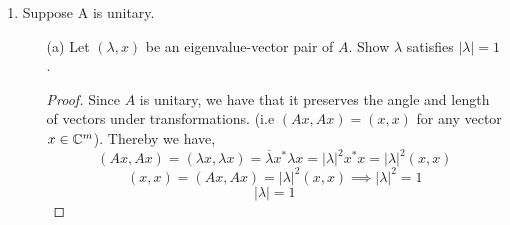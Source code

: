 \documentclass{article}
\begin{document}
\begin{enumerate}
\begin{proof}

By the property of $A$ being hermitian, that we can write any vector, $x \in \C_m, x \neq \vec{0}$ as the linear combination of the orthonormal eigenvectors of $A$, $u_i$. 
\[
    x = \alpha_1u_1 + \cdots + \alpha_mu_m
\]
We then look the inner product, $(Ax, x)$. 
\[
    Ax = A(\alpha_1u_1 + \cdots + \alpha_mu_m) = \lambda_1\alpha_1u_1 + \cdots + \lambda_m\alpha_mu_m
\]
\[
    (Ax)^* = \overline{\lambda_1\alpha_1} u_1^* + \cdots + \overline{\lambda_m\alpha_m}u_m^*
\]
\[
    (Ax, x) = (\overline{\lambda_1\alpha_1} u_1^* + \cdots + \overline{\lambda_m\alpha_m}u_m^*)(\alpha_1u_1 + \cdots + \alpha_mu_m)
\]
Here by the property of an orthonormal vector set, we have that $u_i^*u_j = 0$ if $i \neq j$ and $= 1$ if $i = j$.
\[
    (Ax, x) = \overline{\lambda_1\alpha_1}\alpha_1 + \cdots + \overline{\lambda_m\alpha_m}\alpha_m = \sum_{i=1}^m \lambda_i |\alpha_i|^2
\]
Of course, $|\alpha_i|^2$ is a strictly positive value. So for $(Ax, x) < 0$ we need at least one $\lambda_i < 0$. In fact, it is the case that if even one $\lambda_i < 0$ that $(Ax, x) \ngtr 0$ for all $x \in \C^m$. To prove that $(Ax, x) > 0, \forall x \in \C^m$, we take the case of only the smallest $\lambda_i$, $\lambda_k < 0$ (i.e. $|\lambda_k| < |\lambda_i| , \forall \lambda_i \in (\Lambda(A) - \{\lambda_k\})$). We can show by counter-example
\[
    \lambda_k < 0, x \in \C^m, x = \alpha_1u_1 + \cdots + \alpha_mu_m
\]
\[
    (Ax, x) = \lambda_k|\alpha_k|^2 + \sum_{i = 1, i\neq k}^m \lambda_i|\alpha_i|^2 
\]
\[
    \exists x_* \in \C^m, \text{ such that } |\alpha_k|^2 = \frac{1}{\lambda_k}\sum_{i = 1, i \neq k}^m \lambda_i|\alpha_i|^2 + 1
\]
\[
    (Ax_*, x_*) < 0, \text{ by construction.}
\]
\end{proof} %

\item Suppose A is unitary.

    \begin{enumerate}
    
    \item[(a)] Let $(\lambda, x)$ be an eigenvalue-vector pair of $A$. Show $\lambda$ satisfies $|\lambda| = 1$.
    \begin{proof}
        Since $A$ is unitary, we have that it preserves the angle and length of vectors under transformations. (i.e $(Ax, Ax) = (x, x)$ for any vector $x \in \C^m$). Thereby we have, 
\[
    (Ax, Ax) = (\lambda x, \lambda x) = \overline{\lambda}x^* \lambda x = |\lambda|^2 x^* x = |\lambda|^2 (x, x)
\]
\[
    (x, x) = (Ax, Ax) = |\lambda|^2(x, x) \implies |\lambda|^2 = 1
\]
\[
    |\lambda| = 1
\]
    \end{proof}


\end{enumerate}
\end{enumerate}
\end{document}
